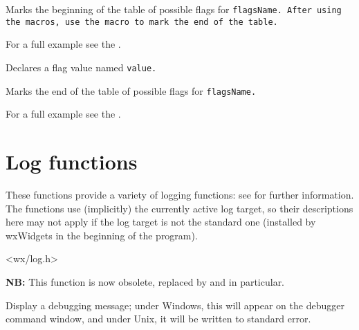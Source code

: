 
Marks the beginning of the table of possible flags for \tt{flagsName}.
After using the  macros, use the
 macro to mark the end of the table.

For a full example see the .


\label{wxflagsmember}


Declares a flag value named \tt{value}.


\label{wxendflags}


Marks the end of the table of possible flags for \tt{flagsName}.

For a full example see the .















\section{Log functions}\label{logfunctions}

These functions provide a variety of logging functions: see  for
further information. The functions use (implicitly) the currently active log
target, so their descriptions here may not apply if the log target is not the
standard one (installed by wxWidgets in the beginning of the program).


<wx/log.h>


\label{wxdebugmsg}


{\bf NB:} This function is now obsolete, replaced by  and  in particular.

Display a debugging message; under Windows, this will appear on the
debugger command window, and under Unix, it will be written to standard
error.

